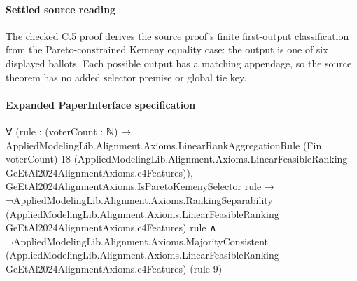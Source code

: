 \documentclass[10pt]{article}
\begin{document}
\paragraph{Settled source reading}
\begin{sloppypar}
The checked C.\allowbreak{}5 proof derives the source proof’s finite first-\allowbreak{}output classification from the Pareto-\allowbreak{}constrained Kemeny equality case:\allowbreak{} the output is one of six displayed ballots.\allowbreak{} Each possible output has a matching appendage, so the source theorem has no added selector premise or global tie key.\allowbreak{}
\end{sloppypar}

\paragraph{Expanded PaperInterface specification}
\begin{ReviewVerbatim}
∀
  (rule :
    (voterCount : ℕ) →
      AppliedModelingLib.Alignment.Axioms.LinearRankAggregationRule (Fin voterCount) 18
        (AppliedModelingLib.Alignment.Axioms.LinearFeasibleRanking GeEtAl2024AlignmentAxioms.c4Features)),
  GeEtAl2024AlignmentAxioms.IsParetoKemenySelector rule →
    ¬AppliedModelingLib.Alignment.Axioms.RankingSeparability
          (AppliedModelingLib.Alignment.Axioms.LinearFeasibleRanking GeEtAl2024AlignmentAxioms.c4Features) rule ∧
      ¬AppliedModelingLib.Alignment.Axioms.MajorityConsistent
          (AppliedModelingLib.Alignment.Axioms.LinearFeasibleRanking GeEtAl2024AlignmentAxioms.c4Features) (rule 9)
\end{ReviewVerbatim}
\end{document}
